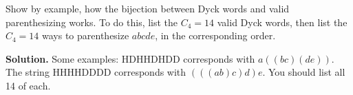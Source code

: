 \documentclass{book}
\begin{document}
\setcounter{project}{185}
\addtocounter{project}{-1}
\begin{activity}[]\label{activity-178}
\hypertarget{p-1100}{}%
Show by example, how the bijection between Dyck words and valid parenthesizing works.  To do this, list the \(C_4 = 14\) valid Dyck words, then list the \(C_4 = 14\) ways to parenthesize \(abcde\), in the corresponding order.%
\par\smallskip%
\noindent\textbf{Solution.}\hypertarget{solution-117}{}\quad%
\hypertarget{p-1101}{}%
Some examples: HDHHDHDD corresponds with \(a((bc)(de))\).  The string HHHHDDDD corresponds with \((((ab)c)d)e\).  You should list all 14 of each.%
\end{activity}
\end{document}
